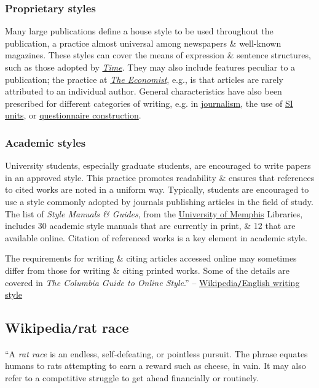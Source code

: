 \documentclass{article}
\begin{document}
\subsubsection{Proprietary styles}
Many large publications define a house style to be used throughout the publication, a practice almost universal among newspapers \& well-known magazines. These styles can cover the means of expression \& sentence structures, such as those adopted by \href{https://en.wikipedia.org/wiki/Time_(magazine)#Style}{\it Time}. They may also include features peculiar to a publication; the practice at \href{https://en.wikipedia.org/wiki/The_Economist#Tone_and_voice}{\it The Economist}, e.g., is that articles are rarely attributed to an individual author. General characteristics have also been prescribed for different categories of writing, e.g. in \href{https://en.wikipedia.org/wiki/News_style}{journalism}, the use of \href{https://en.wikipedia.org/wiki/SI#SI_writing_style}{SI units}, or \href{https://en.wikipedia.org/wiki/Questionnaire_construction}{questionnaire construction}.

\subsubsection{Academic styles}
University students, especially graduate students, are encouraged to write papers in an approved style. This practice promotes readability \& ensures that references to cited works are noted in a uniform way. Typically, students are encouraged to use a style commonly adopted by journals publishing articles in the field of study. The list of {\it Style Manuals \& Guides}, from the \href{https://en.wikipedia.org/wiki/University_of_Memphis}{University of Memphis} Libraries, includes 30 academic style manuals that are currently in print, \& 12 that are available online. Citation of referenced works is a key element in academic style.

The requirements for writing \& citing articles accessed online may sometimes differ from those for writing \& citing printed works. Some of the details are covered in {\it The Columbia Guide to Online Style}.'' -- \href{https://en.wikipedia.org/wiki/English_writing_style}{Wikipedia{\tt/}English writing style}


\subsection{Wikipedia{\tt/}rat race}
``A {\it rat race} is an endless, self-defeating, or pointless pursuit. The phrase equates humans to rats attempting to earn a reward such as cheese, in vain. It may also refer to a competitive struggle to get ahead financially or routinely.
\end{document}
